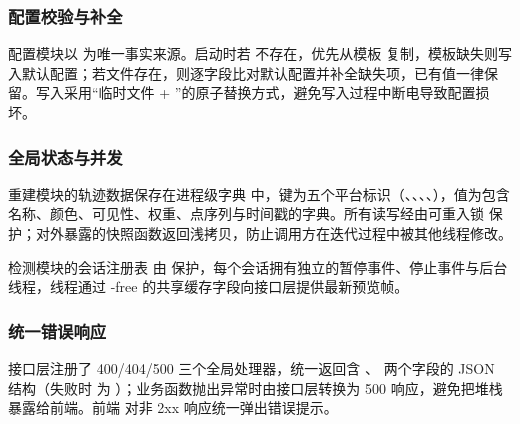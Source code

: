 \subsubsection{配置校验与补全}

配置模块以  为唯一事实来源。启动时若  不存在，优先从模板  复制，模板缺失则写入默认配置；若文件存在，则逐字段比对默认配置并补全缺失项，已有值一律保留。写入采用“临时文件 + ”的原子替换方式，避免写入过程中断电导致配置损坏。

\subsubsection{全局状态与并发}

重建模块的轨迹数据保存在进程级字典  中，键为五个平台标识（、、、、），值为包含名称、颜色、可见性、权重、点序列与时间戳的字典。所有读写经由可重入锁  保护；对外暴露的快照函数返回浅拷贝，防止调用方在迭代过程中被其他线程修改。

检测模块的会话注册表  由  保护，每个会话拥有独立的暂停事件、停止事件与后台线程，线程通过 -free 的共享缓存字段向接口层提供最新预览帧。

\subsubsection{统一错误响应}

接口层注册了 400/404/500 三个全局处理器，统一返回含 、 两个字段的 JSON 结构（失败时  为 ）；业务函数抛出异常时由接口层转换为 500 响应，避免把堆栈暴露给前端。前端  对非 2xx 响应统一弹出错误提示。

